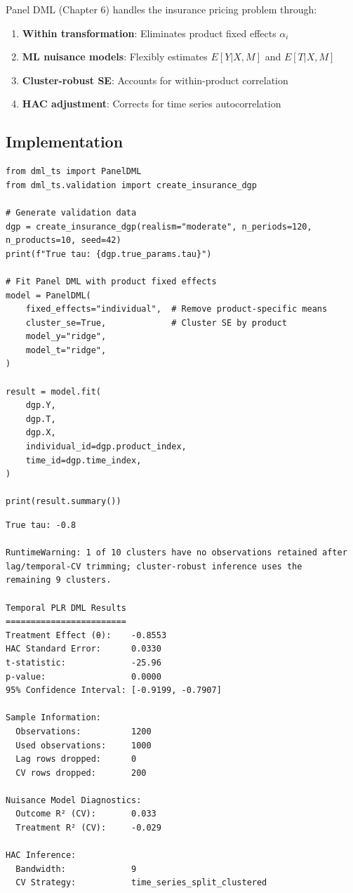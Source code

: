 Panel DML (Chapter 6) handles the insurance pricing problem through:

\begin{enumerate}
    \item \textbf{Within transformation}: Eliminates product fixed effects $\alpha_i$
    \item \textbf{ML nuisance models}: Flexibly estimates $E[Y|X, M]$ and $E[T|X, M]$
    \item \textbf{Cluster-robust SE}: Accounts for within-product correlation
    \item \textbf{HAC adjustment}: Corrects for time series autocorrelation
\end{enumerate}

\subsection{Implementation}

\begin{verbatim}
from dml_ts import PanelDML
from dml_ts.validation import create_insurance_dgp

# Generate validation data
dgp = create_insurance_dgp(realism="moderate", n_periods=120, n_products=10, seed=42)
print(f"True tau: {dgp.true_params.tau}")

# Fit Panel DML with product fixed effects
model = PanelDML(
    fixed_effects="individual",  # Remove product-specific means
    cluster_se=True,             # Cluster SE by product
    model_y="ridge",
    model_t="ridge",
)

result = model.fit(
    dgp.Y,
    dgp.T,
    dgp.X,
    individual_id=dgp.product_index,
    time_id=dgp.time_index,
)

print(result.summary())
\end{verbatim}

\begin{verbatim}
True tau: -0.8

RuntimeWarning: 1 of 10 clusters have no observations retained after
lag/temporal-CV trimming; cluster-robust inference uses the
remaining 9 clusters.

Temporal PLR DML Results
========================
Treatment Effect (θ):    -0.8553
HAC Standard Error:      0.0330
t-statistic:             -25.96
p-value:                 0.0000
95% Confidence Interval: [-0.9199, -0.7907]

Sample Information:
  Observations:          1200
  Used observations:     1000
  Lag rows dropped:      0
  CV rows dropped:       200

Nuisance Model Diagnostics:
  Outcome R² (CV):       0.033
  Treatment R² (CV):     -0.029

HAC Inference:
  Bandwidth:             9
  CV Strategy:           time_series_split_clustered
\end{verbatim}

